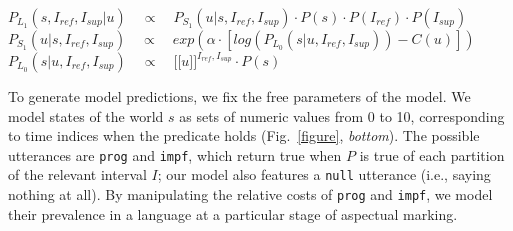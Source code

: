 \documentclass[12pt]{article}
\newcommand{\sem}[1]{\mbox{$[\![$#1$]\!]$}}
\begin{document}
\vspace{-7pt}
\begin{exe}
\ex $P_{L_1}(s, I_{ref}, I_{sup} | u) \quad \propto \quad P_{S_1}(u | s, I_{ref}, I_{sup}) \cdot P(s) \cdot P(I_{ref}) \cdot P(I_{sup})$\\
$P_{S_1}(u | s, I_{ref}, I_{sup}) \quad \propto \quad exp(\alpha \cdot [log(P_{L_0}(s | u, I_{ref}, I_{sup})) - C(u)])$\\
$P_{L_0}(s | u, I_{ref}, I_{sup}) \quad \propto \quad \sem{$u$}^{I_{ref}, I_{sup}} \cdot P(s)$
\end{exe}
\vspace{-7pt}
To generate model predictions, we fix the free parameters of the model. We model states of the world $s$ as sets of numeric values from 0 to 10, corresponding to time indices when the predicate holds (Fig.~\ref{figure}, \emph{bottom}). The possible utterances are \texttt{prog} and \texttt{impf}, which return true when $P$ is true of each partition of the relevant interval $I$; our model also features a \texttt{null} utterance (i.e., saying nothing at all). By manipulating the relative costs of \texttt{prog} and \texttt{impf}, we model their prevalence in a language at a particular stage of aspectual marking. 
\end{document}
